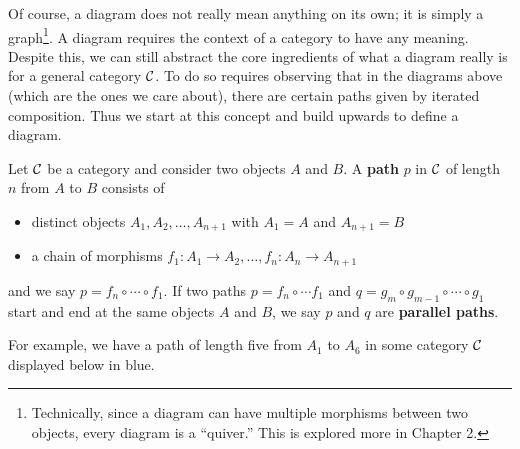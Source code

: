     Of course, a diagram does not really mean anything on its own; it is simply 
    a graph\footnote{Technically, since a diagram can have multiple morphisms between 
    two objects, every diagram is a ``quiver.'' This is explored more in Chapter 2.}. 
    A diagram requires the context of a category to have any meaning. 
    Despite this, we can still abstract the core ingredients of what a diagram really 
    is for a general category $\mathcal{C}$. To do so requires observing that in the diagrams 
    above (which are the ones we care about), there are certain paths given 
    by iterated composition. Thus we start at this concept and build upwards to define 
    a diagram.

    \begin{definition}
        Let $\mathcal{C}$ be a category and consider two objects 
        $A$ and $B$. A \textbf{path} $p$ in $\mathcal{C}$ 
        of length $n$ from $A$ to $B$
        consists of 
        \begin{itemize}
            \item  distinct objects 
            $A_1, A_2, \dots, A_{n+1}$
            with $A_1=  A$ and $A_{n+1} = B$
            \item a chain of morphisms $f_1: A_1 \to A_2, \dots, 
            f_{n}: A_{n} \to A_{n+1}$
        \end{itemize}
        and we say $p = f_n \circ \cdots \circ f_1$. If two paths $p = f_n \circ \cdots f_1$ 
        and $q = g_m \circ g_{m-1} \circ \cdots \circ g_1$ start and end at the same objects 
        $A$ and $B$, we say $p$ and $q$ are \textbf{parallel paths}. 
    \end{definition}
    For example, we have a path of length five from $A_1$ to $A_6$ 
    in some category $\mathcal{C}$ displayed below in blue.

